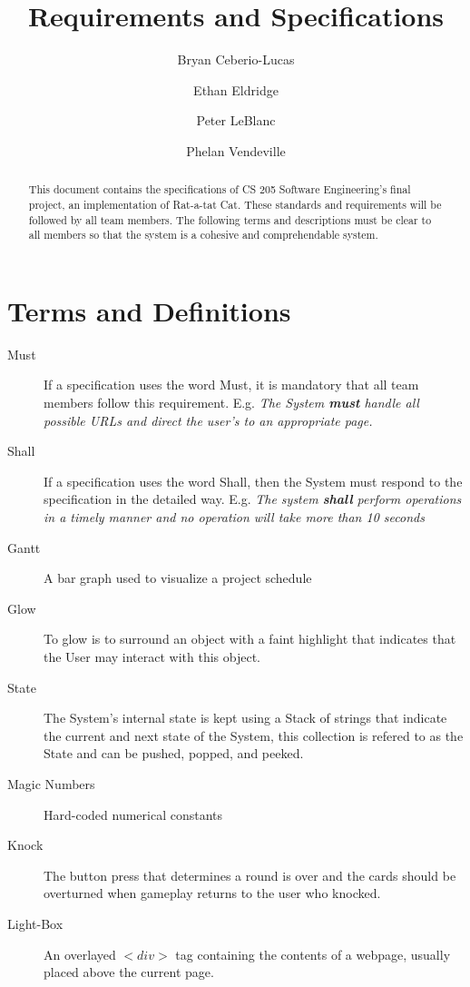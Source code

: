 \documentclass[12pt]{IEEEtran}
\title{Requirements and Specifications}
\author{Bryan Ceberio-Lucas \and Ethan Eldridge \and Peter LeBlanc \and Phelan Vendeville }
\begin{document}
\maketitle

\begin{abstract}
	This document contains the specifications of CS 205 Software  Engineering's final project, an implementation of Rat-a-tat Cat. These standards and requirements will be followed by all team members. The following terms and descriptions must be clear to all members so that the system is a cohesive and comprehendable system.
\end{abstract}

\tableofcontents

\section{Terms and Definitions}
\label{sec:TermsDefinitions}
	\begin{description}
		\item[Must] If a specification uses the word Must, it is mandatory that all team members follow this requirement. E.g.  \textit{The System \textbf{must} handle all possible URLs and direct the user's to an appropriate page.} 
		\item[Shall] If a specification uses the word Shall, then the System must respond to the specification in the detailed way. E.g. \textit{The system \textbf{shall} perform operations in a timely manner and no operation will take more than 10 seconds}
		\item[Gantt] A bar graph used to visualize a project schedule
		\item[Glow] To glow is to surround an object with a faint highlight that indicates that the User may interact with this object.
		\item[State] The System's internal state is kept using a Stack of strings that indicate the current and next state of the System, this collection is refered to as the State and can be pushed, popped, and 	peeked.
		\item[Magic Numbers] \hspace{4em} Hard-coded numerical constants 
		\item[Knock] \hspace{.5em} The button press that determines a round is over and the cards should be overturned when gameplay returns to the user who knocked.
		\item[Light-Box] \hspace{2em}An overlayed $<div>$ tag containing the contents of a webpage, usually placed above the current page.
	\end{description}
\end{document}
